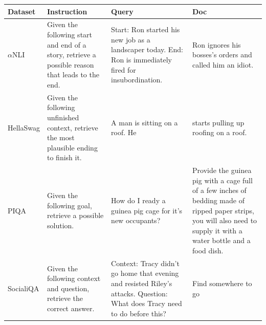 {\scriptsize \begin{longtable}{ p{} | p{} | p{} | p{}} \toprule
Dataset&Instruction &Query &Doc \\\midrule
$\alpha$NLI &Given the following start and end of a story, retrieve a possible reason that leads to the end. &Start: Ron started his new job as a landscaper today. End: Ron is immediately fired for insubordination. &Ron ignores his bosses's orders and called him an idiot. \\
\midrule
HellaSwag &Given the following unfinished context, retrieve the most plausible ending to finish it. &A man is sitting on a roof. He &starts pulling up roofing on a roof. \\
\midrule
PIQA &Given the following goal, retrieve a possible solution. &How do I ready a guinea pig cage for it's new occupants? &Provide the guinea pig with a cage full of a few inches of bedding made of ripped paper strips, you will also need to supply it with a water bottle and a food dish. \\
\midrule
SocialiQA &Given the following context and question, retrieve the correct answer. &Context: Tracy didn't go home that evening and resisted Riley's attacks. Question: What does Tracy need to do before this? &Find somewhere to go \\
\midrule

\end{longtable}}

